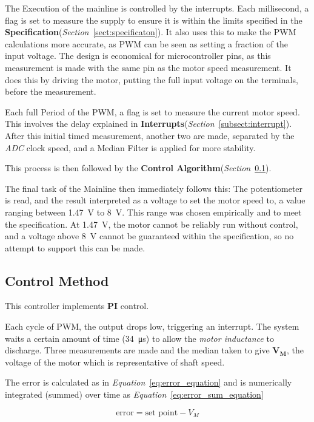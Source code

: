 \documentclass[a4paper]{article}
\begin{document}
The Execution of the mainline is controlled by the interrupts. Each millisecond, a flag is set to measure the supply to ensure it is within the limits specified in the \textbf{Specification}(\textit{Section}~\ref{sect:specificaton}). It also uses this to make the PWM calculations more accurate, as PWM can be seen as setting a fraction of the input voltage. The design is economical for microcontroller pins, as this measurement is made with the same pin as the motor speed measurement. It does this by driving the motor, putting the full input voltage on the terminals, before the measurement.

Each full Period of the PWM, a flag is set to measure the current motor speed. This involves the delay explained in \textbf{Interrupts}(\textit{Section}~\ref{subsect:interrupt}). After this initial timed measurement, another two are made, separated by the \textit{ADC} clock speed, and a Median Filter is applied for more stability.

This process is then followed by the \textbf{Control Algorithm}(\textit{Section}~\ref{subsect:control_method}).

The final task of the Mainline then immediately follows this: The potentiometer is read, and the result interpreted as a voltage to set the motor speed to, a value ranging between \SI{1.47}{\volt} to \SI{8}{\volt}. This range was chosen empirically and to meet the specification. At \SI{1.47}{\volt}, the motor cannot be reliably run without control, and a voltage above \SI{8}{\volt} cannot be guaranteed within the specification, so no attempt to support this can be made.


\subsection{Control Method} \label{subsect:control_method}
This controller implements \textbf{PI} control.

Each cycle of PWM, the output drops low, triggering an interrupt. The system waits a certain amount of time (\SI{34}{\micro\second}) to allow the \textit{motor inductance} to discharge. Three measurements are made and the median taken to give $\mathbf{V_M}$, the voltage of the motor which is representative of shaft speed.

The error is calculated as in \textit{Equation}~\ref{eq:error_equation} and is numerically integrated (summed) over time as \textit{Equation}~\ref{eq:error_sum_equation}

\begin{equation} \label{eq:error_equation}
    \text{error} = \text{set point} - V_M 
\end{equation}
\end{document}
